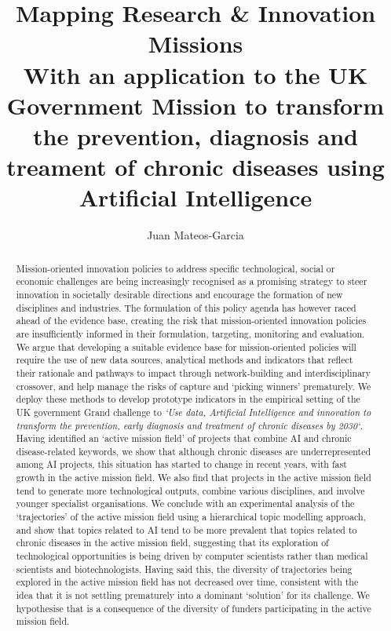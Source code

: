 \documentclass[11pt]{article}
\begin{document}
\title{%
\textbf{Mapping Research \& Innovation Missions \\
\large With an application to the UK Government Mission to transform the prevention, diagnosis and treament of chronic diseases using Artificial Intelligence}}
\author{Juan Mateos-Garcia}
\maketitle
\begin{abstract}
Mission-oriented innovation policies to address specific technological, social or economic challenges are being increasingly recognised as a promising strategy to steer innovation in societally desirable directions and encourage the formation of new disciplines and industries. The formulation of this policy agenda has however raced ahead of the evidence base, creating the risk that mission-oriented innovation policies are insufficiently informed in their formulation, targeting, monitoring and evaluation. We argue that developing a suitable evidence base for mission-oriented policies will require the use of new data sources, analytical methods and indicators that reflect their rationale and pathways to impact through network-building and interdisciplinary crossover, and help manage the risks of capture and `picking winners' prematurely. We deploy these methods to develop prototype indicators in the empirical setting of the UK government Grand challenge to \textit{`Use data, Artificial Intelligence and innovation to transform the prevention, early diagnosis and treatment of chronic diseases by 2030`}. Having identified an `active mission field' of projects that combine AI and chronic disease-related keywords, we show that although chronic diseases are underrepresented among AI projects, this situation has started to change in recent years, with fast growth in the active mission field. We also find that projects in the active mission field tend to generate more technological outputs, combine various disciplines, and involve younger specialist organisations. We conclude with an experimental analysis of the `trajectories' of the active mission field using a hierarchical topic modelling approach, and show that topics related to AI tend to be more prevalent that topics related to chronic diseases in the active mission field, suggesting that its exploration of technological opportunities is being driven by computer scientists rather than medical scientists and biotechnologists. Having said this, the diversity of trajectories being explored in the active mission field has not decreased over time, consistent with the idea that it is not settling prematurely into a dominant `solution' for its challenge. We hypothesise that is a consequence of the diversity of funders participating in the active mission field. 
\end{abstract}
\end{document}
